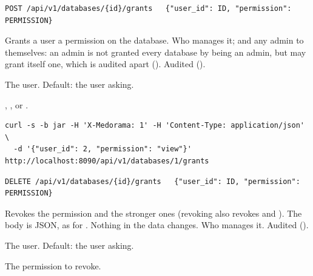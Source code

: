 \begin{lstlisting}[style=signature]
POST /api/v1/databases/{id}/grants   {"user_id": ID, "permission": PERMISSION}
\end{lstlisting}
Grants a user a permission on the database. Who manages it; and any admin to themselves: an
admin is not granted every database by being an admin, but may grant itself one, which is
audited apart (). Audited ().
\begin{params}
\item[user\_id] The user. Default: the user asking.
\item[permission] , ,  or .
\end{params}
\begin{lstlisting}[style=shell]
curl -s -b jar -H 'X-Medorama: 1' -H 'Content-Type: application/json' \
  -d '{"user_id": 2, "permission": "view"}' http://localhost:8090/api/v1/databases/1/grants
\end{lstlisting}

\begin{lstlisting}[style=signature]
DELETE /api/v1/databases/{id}/grants   {"user_id": ID, "permission": PERMISSION}
\end{lstlisting}
Revokes the permission and the stronger ones (revoking  also revokes  and
\code{manage}). The body is JSON, as for \code{POST}. Nothing in the data changes. Who manages
it. Audited (\code{revoke}).
\begin{params}
\item[user\_id] The user. Default: the user asking.
\item[permission] The permission to revoke.
\end{params}


